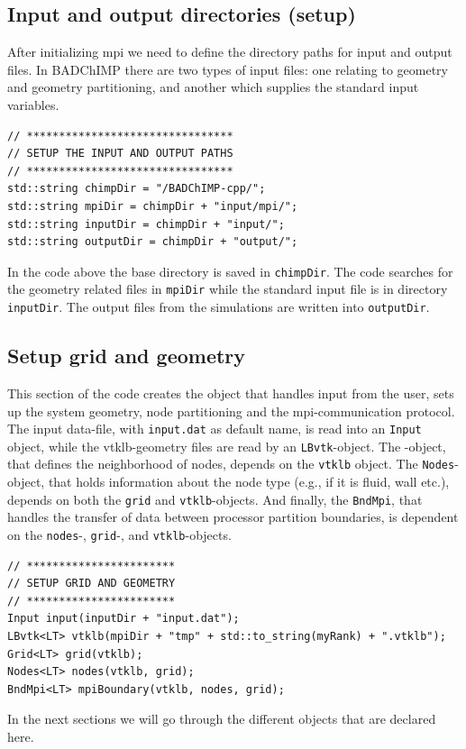\documentclass[11pt,a4paper]{report}
\begin{document}
\subsection{Input and output directories (setup)}
After initializing mpi we need to define the directory paths for input and output files. In BADChIMP there are two types of input files: one relating to geometry and geometry partitioning, and another which supplies the standard input variables.
\begin{verbatim}
// ********************************
// SETUP THE INPUT AND OUTPUT PATHS
// ********************************
std::string chimpDir = "/BADChIMP-cpp/";
std::string mpiDir = chimpDir + "input/mpi/";
std::string inputDir = chimpDir + "input/";
std::string outputDir = chimpDir + "output/";
\end{verbatim}
In the code above the base directory is saved in \texttt{chimpDir}. The code searches for the geometry related files in \texttt{mpiDir} while the standard input file is in directory \texttt{inputDir}. The output files from the simulations are written into \texttt{outputDir}.  

\subsection{Setup grid and geometry}
This section of the code creates the object that handles input from the user, sets up the system geometry, node partitioning and the mpi-communication protocol. 
The input data-file, with \texttt{input.dat} as default name, is read into an \texttt{Input} object, while the vtklb-geometry files are read by an \texttt{LBvtk}-object. The -object, that defines the neighborhood of nodes, depends on the \texttt{vtklb} object. The \texttt{Nodes}-object, that holds information about the node type (e.g., if it is fluid, wall etc.), depends on both the \texttt{grid} and \texttt{vtklb}-objects. And finally, the \texttt{BndMpi}, that handles the transfer of data between processor partition boundaries, is dependent on the \texttt{nodes}-, \texttt{grid}-, and \texttt{vtklb}-objects.  
\begin{verbatim}
// ***********************
// SETUP GRID AND GEOMETRY
// ***********************
Input input(inputDir + "input.dat");
LBvtk<LT> vtklb(mpiDir + "tmp" + std::to_string(myRank) + ".vtklb");
Grid<LT> grid(vtklb);
Nodes<LT> nodes(vtklb, grid);
BndMpi<LT> mpiBoundary(vtklb, nodes, grid);
\end{verbatim}
In the next sections we will go through the different objects that are declared here.
\end{document}
